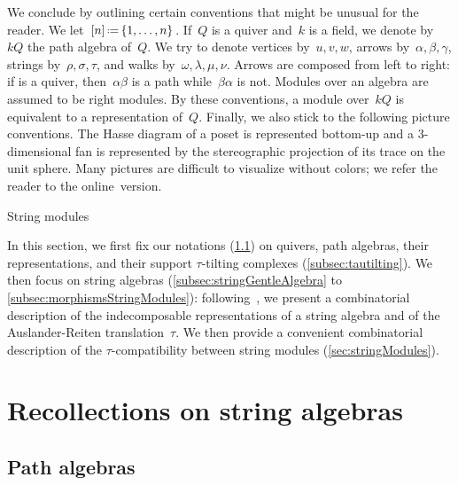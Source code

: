 \documentclass{amsart}
\makeatletter
\theoremstyle{definition}
\newcommand{\eqdef}{\mbox{\,\raisebox{0.2ex}{\scriptsize\ensuremath{\mathrm:}}\ensuremath{=}\,}} %
\def\part{\@startsection{part}{1}%
\z@{.7\linespacing\@plus\linespacing}{.8\linespacing}%
{\LARGE\sffamily\centering}}
\makeatother
\begin{document}
We conclude by outlining certain conventions that might be unusual for the reader.
%
We let~$[n] \eqdef \{1, \dots, n\}$.
%
If~$Q$ is a quiver and~$k$ is a field, we denote by~$kQ$ the path algebra of~$Q$.
We try to denote vertices by~$u,v,w$, arrows by~$\alpha, \beta, \gamma$, strings by~$\rho, \sigma, \tau$, and walks by~$\omega, \lambda, \mu, \nu$.
Arrows are composed from left to right: if  is a quiver, then~$\alpha\beta$ is a path while~$\beta\alpha$ is not.
Modules over an algebra are assumed to be right modules.
By these conventions, a module over~$kQ$ is equivalent to a representation of~$Q$.
%
Finally, we also stick to the following picture conventions.
The Hasse diagram of a poset is represented bottom-up and a $3$-dimensional fan is represented by the stereographic projection of its trace on the unit sphere.
Many pictures are difficult to visualize without colors; we refer the reader to the online~version.



\newpage
\part{String modules}
\label{part:algebra}

In this section, we first fix our notations (\ref{subsec:pathAlgebra}) on quivers, path algebras, their representations, and their support $\tau$-tilting complexes (\ref{subsec:tautilting}).
We then focus on string algebras (\ref{subsec:stringGentleAlgebra} to \ref{subsec:morphismsStringModules}): following~\cite{ButlerRingel}, we present a combinatorial description of the indecomposable representations of a string algebra and of the Auslander-Reiten translation~$\tau$.
We then provide a convenient combinatorial description of the $\tau$-compatibility between string modules (\ref{sec:stringModules}).

\section{Recollections on string algebras}
\label{sec:recollectionsStringAlgebras}

\subsection{Path algebras}
\label{subsec:pathAlgebra}
\end{document}
